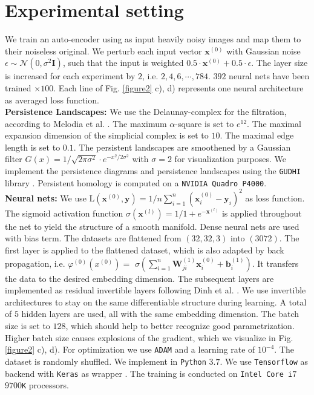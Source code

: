 \documentclass[runningheads,orivec]{llncs}
\begin{document}
\section{Experimental setting}

We train an auto-encoder using as input heavily noisy images and map them to their noiseless original. We perturb each input vector $\textbf{x}^{(0)}$ with Gaussian noise $\epsilon \sim \mathcal{N}(0,\sigma^2 \mathbf{I})$, such that the input is weighted $0.5 \cdot \textbf{x}^{(0)} + 0.5 \cdot \epsilon$. The layer size is increased for each experiment by $2$, i.e. $2,4,6, \cdots, 784$. $392$ neural nets have been trained $\times 100$. Each line of Fig. \ref{figure2} c), d) represents one neural architecture as averaged loss function.\\[0.4cm]
\textbf{Persistence Landscapes:} We use the Delaunay-complex for the filtration, according to Melodia et al. \cite{lume}. The maximum $\alpha$-square is set to $e^{12}$. The maximal expansion dimension of the simplicial complex is set to $10$. The maximal edge length is set to $0.1$. The persistent landscapes are smoothened by a Gaussian filter $G(x) = 1 / \sqrt{2 \pi \sigma^2} \cdot e^{- x^2 / 2 \sigma^2}$ with $\sigma = 2$ for visualization purposes. We implement the persistence diagrams and persistence landscapes using the \texttt{GUDHI} library \cite{gudhi:urm}. Persistent homology is computed on a \texttt{NVIDIA Quadro P4000}.\\[0.4cm]
\textbf{Neural nets:} We use $\text{L}(\textbf{x}^{(0)}, \textbf{y}) = 1/n \sum_{i=1}^{n} (\textbf{x}^{(0)}_i-\textbf{y}_i)^2$ as loss function. The sigmoid activation function $\sigma(\mathbf{x}^{(l)}) = 1 / 1 + e^{-\mathbf{x}^{(l)}}$ is applied throughout the net to yield the structure of a smooth manifold. Dense neural nets are used with bias term. The datasets are flattened from $(32,32,3)$ into $(3072)$. The first layer is applied to the flattened dataset, which is also adapted by back propagation, i.e. $\varphi^{(0)}(x^{(0)}) =$ $\sigma(\sum_{i=1}^{n} \textbf{W}_{ji}^{(1)} \textbf{x}_{i}^{(0)} + \textbf{b}_{i}^{(1)})$. It transfers the data to the desired embedding dimension. The subsequent layers are implemented as residual invertible layers following Dinh et al. \cite{DinhSB17}. We use invertible architectures to stay on the same differentiable structure during learning. A total of $5$ hidden layers are used, all with the same embedding dimension. The batch size is set to $128$, which should help to better recognize good parametrization. Higher batch size causes explosions of the gradient, which we visualize in Fig. \ref{figure2} c), d). For optimization we use \texttt{ADAM} \cite{KingmaB14} and a learning rate of $10^{-4}$. The dataset is randomly shuffled. We implement in \texttt{Python} $3.7$. We use \texttt{Tensorflow} as backend \cite{tensorflow2015-whitepaper} with \texttt{Keras} as wrapper \cite{chollet2015keras}. The training is conducted on \texttt{Intel Core i}$7$ $9700$\texttt{K} processors.\\[0.4cm]
\end{document}
